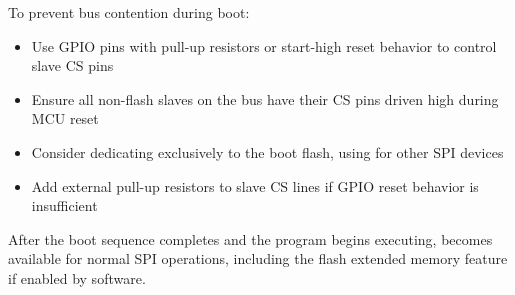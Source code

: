 To prevent bus contention during boot:

\begin{itemize}
	\item Use GPIO pins with pull-up resistors or start-high reset behavior to control slave CS pins
	\item Ensure all non-flash slaves on the  bus have their CS pins driven high during MCU reset
	\item Consider dedicating  exclusively to the boot flash, using  for other SPI devices
	\item Add external pull-up resistors to slave CS lines if GPIO reset behavior is insufficient
\end{itemize}

After the boot sequence completes and the program begins executing,  becomes available for normal SPI operations, including the flash extended memory feature if enabled by software.
